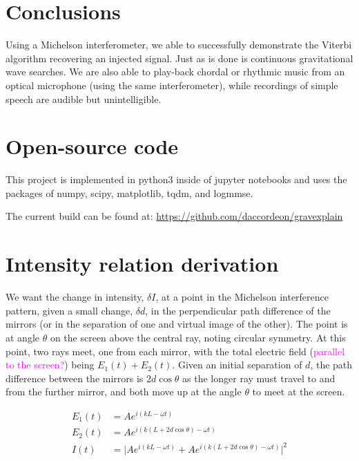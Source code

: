 \documentclass[prb,preprint]{revtex4-1}
\newcommand{\jam}{\textcolor{magenta}}
\begin{document}
\section{Conclusions}

Using a Michelson interferometer, we able to successfully demonstrate the Viterbi algorithm recovering an injected signal. Just as is done is continuous gravitational wave searches. We are also able to play-back chordal or rhythmic music from an optical microphone (using the same interferometer), while recordings of simple speech are audible but unintelligible.

\newpage
\appendix

\section{Open-source code}
This project is implemented in python3\cite{python} inside of jupyter notebooks\cite{jupyter}\cite{ipython} and uses the packages of numpy\cite{numpy}, scipy\cite{scipy}, matplotlib\cite{matplotlib}, tqdm\cite{tqdm}, and logmmse\cite{logmmse}.

The current build can be found at:
\url{https://github.com/daccordeon/gravexplain}

\section{Intensity relation derivation}
\label{app:intensity_derivation}

We want the change in intensity, $\delta I$, at a point in the Michelson interference pattern, given a small change, $\delta d$, in the perpendicular path difference of the mirrors (or in the separation of one and virtual image of the other). The point is at angle $\theta$ on the screen above the central ray, noting circular symmetry. At this point, two rays meet, one from each mirror, with the total electric field (\jam{parallel to the screen?}) being $E_1(t) + E_2(t)$. Given an initial separation of $d$, the path difference between the mirrors is $2 d \cos{\theta}$ as the longer ray must travel to and from the further mirror, and both move up at the angle $\theta$ to meet at the screen.

\begin{align}
\label{eq:intensity_derivation}
    E_1(t) &= A e^{i (k L - \omega t)} \\
    E_2(t) &= A e^{i (k (L + 2 d \cos{\theta}) - \omega t)} \\
    I(t) &= \lvert A e^{i (k L - \omega t)} + A e^{i (k (L + 2 d \cos{\theta}) - \omega t)} \rvert^2
\end{align}
\end{document}
